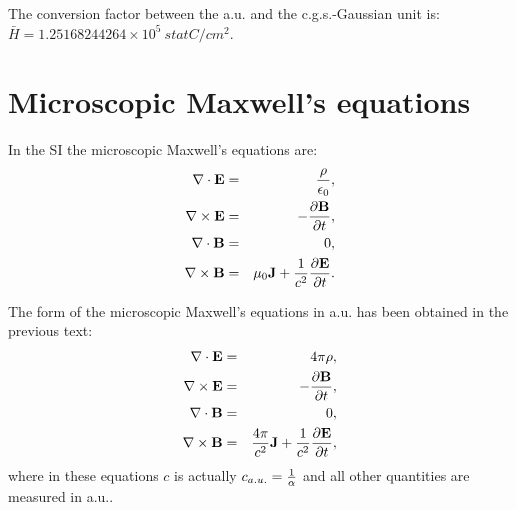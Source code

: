 \documentclass[12pt,a4paper]{article}
\def\htoh{7.95774715242\times 10^{1}}
\def\barhcgs{1.25168244264\times 10^{5}}
\begin{document}


{\color{green} The conversion factor between the a.u. and the c.g.s.-Gaussian 
unit is:
$\bar H = \barhcgs\ statC/cm^2$.
}

\newpage
\section{\color{coral}Microscopic Maxwell's equations}
In the SI the microscopic Maxwell's equations are:
\begin{eqnarray}
\nabla \cdot {\bf E} &=& {\rho\over {\epsilon_0}}, \\
\nabla \times {\bf E} &=& -{\partial {\bf B} \over \partial t}, \\
\nabla \cdot {\bf B} &=& 0, \\
\nabla \times {\bf B} &=& \mu_0{\bf J}+ {1\over c^2}
{\partial {\bf E} \over \partial t}. 
\end{eqnarray}

{\color{web-blue} The form of the microscopic Maxwell's equations
in a.u. has been obtained in the previous text:
\begin{eqnarray}
\nabla \cdot {\bf E} &=& 4 \pi \rho, \\
\nabla \times {\bf E} &=& -{\partial {\bf B} \over \partial t}, \\
\nabla \cdot {\bf B} &=& 0, \\
\nabla \times {\bf B} &=& {4 \pi \over c^2} {\bf J}+ {1\over c^2}
{\partial {\bf E} \over \partial t}, 
\end{eqnarray}
where in these equations $c$ is actually $c_{a.u.}={1\over \alpha}$ and all 
other quantities are measured in a.u..
}
\\
\end{document}
